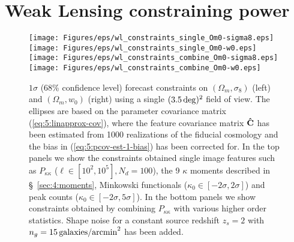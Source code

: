 \section{Weak Lensing constraining power}

\begin{figure}
\begin{center}
\texttt{[image: Figures/eps/wl\_constraints\_single\_Om0-sigma8.eps]} \texttt{[image: Figures/eps/wl\_constraints\_single\_Om0-w0.eps]}
\texttt{[image: Figures/eps/wl\_constraints\_combine\_Om0-sigma8.eps]} \texttt{[image: Figures/eps/wl\_constraints\_combine\_Om0-w0.eps]}
\end{center}
\caption{$1\sigma$ (68\% confidence level) forecast constraints on $(\Omega_m,\sigma_8)$ (left) and $(\Omega_m,w_0)$ (right) using a single $(3.5\,{\rm deg})^2$ field of view. The ellipses are based on the parameter covariance matrix (\ref{eq:5:linapprox-cov}), where the feature covariance matrix $\mathbf{\hat{C}}$ has been estimated from 1000 realizations of the fiducial cosmology and the bias in (\ref{eq:5:pcov-est-1-bias}) has been corrected for. In the top panels we show the constraints obtained single image features such as $P_{\kappa\kappa}$ ($\ell \in [10^2,10^5],N_d=100$), the 9 $\kappa$ moments described in \S~\ref{sec:4:moments}, Minkowski functionals ($\kappa_0\in[-2\sigma,2\sigma]$) and peak counts ($\kappa_0\in[-2\sigma,5\sigma]$). In the bottom panels we show constraints obtained by combining $P_{\kappa\kappa}$ with various higher order statistics. Shape noise for a constant source redshift $z_s=2$ with $n_g=15\,{\rm galaxies/arcmin}^2$ has been added.}
\label{fig:5:wlconstraints}
\end{figure}

%